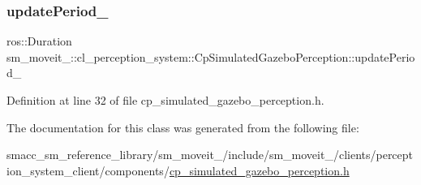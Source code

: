 \subsubsection{\texorpdfstring{update\+Period\+\_\+}{updatePeriod\_}}
{\footnotesize\ttfamily ros\+::\+Duration sm\+\_\+moveit\+\_\+::cl\+\_\+perception\+\_\+system\+::\+Cp\+Simulated\+Gazebo\+Perception\+::update\+Period\+\_\+\hspace{0.3cm}{\ttfamily [private]}}



Definition at line 32 of file cp\+\_\+simulated\+\_\+gazebo\+\_\+perception.\+h.



The documentation for this class was generated from the following file\+:\begin{DoxyCompactItemize}
\item 
smacc\+\_\+sm\+\_\+reference\+\_\+library/sm\+\_\+moveit\+\_/include/sm\+\_\+moveit\+\_/clients/perception\+\_\+system\+\_\+client/components/\hyperlink{cp__simulated__gazebo__perception_8h}{cp\+\_\+simulated\+\_\+gazebo\+\_\+perception.\+h}\end{DoxyCompactItemize}

